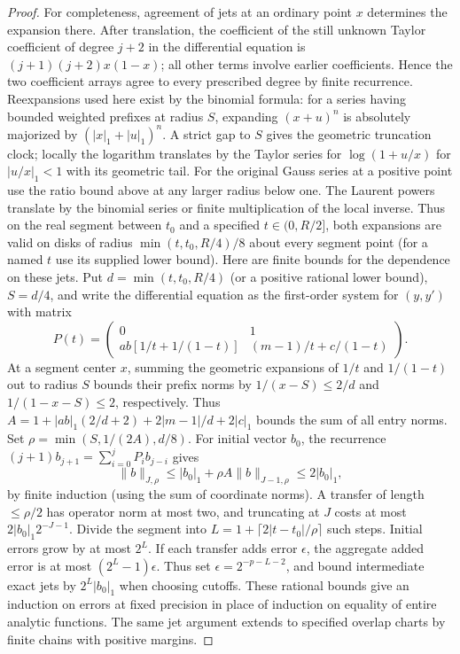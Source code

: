 \begin{proof}
For completeness, agreement of jets at an ordinary point $x$ determines
the expansion there. After translation, the coefficient of the still
unknown Taylor coefficient of degree $j+2$ in the differential equation
is $(j+1)(j+2)x(1-x)$; all other terms involve earlier coefficients.
Hence the two coefficient arrays agree to every prescribed degree by
finite recurrence. Reexpansions used here exist by the binomial formula:
for a series having bounded weighted prefixes at radius $S$, expanding
$(x+u)^n$ is absolutely majorized by $(|x|_1+|u|_1)^n$. A strict gap
to $S$ gives the geometric truncation clock; locally the logarithm
translates by the Taylor series for $\log(1+u/x)$ for $|u/x|_1<1$
with its geometric tail. For the original Gauss series at a positive
point use the ratio bound above at any larger radius below one.
The Laurent powers translate by the binomial series or finite
multiplication of the local inverse. Thus on the real segment between
$t_0$ and a specified $t\in(0,R/2]$, both expansions are valid on disks
of radius $\min(t,t_0,R/4)/8$ about every segment point (for a named
$t$ use its supplied lower bound). Here are finite
bounds for the dependence on these jets. Put $d=\min(t,t_0,R/4)$
(or a positive rational lower bound), $S=d/4$, and write the differential
equation as the first-order system for $(y,y')$ with matrix
\[
 P(t)=
 \begin{pmatrix}
 0&1\\
 ab[1/t+1/(1-t)]&(m-1)/t+c/(1-t)
 \end{pmatrix}.
\]
At a segment center $x$, summing the geometric expansions of $1/t$ and
$1/(1-t)$ out to radius $S$ bounds their prefix norms by
$1/(x-S)\le 2/d$ and $1/(1-x-S)\le2$, respectively. Thus
$A=1+|ab|_1(2/d+2)+2|m-1|/d+2|c|_1$ bounds the sum of all entry norms.
Set $\rho=\min(S,1/(2A),d/8)$. For initial vector $b_0$, the recurrence
$(j+1)b_{j+1}=\sum_{i=0}^j P_i b_{j-i}$ gives
\[
 \|b\|_{J,\rho}\le |b_0|_1+\rho A\|b\|_{J-1,\rho}\le 2|b_0|_1 ,
\]
by finite induction (using the sum of coordinate norms). A transfer of
length $\le\rho/2$ has operator norm at most two, and truncating at $J$
costs at most $2|b_0|_1 2^{-J-1}$. Divide the segment into
$L=1+\lceil2|t-t_0|/\rho\rceil$ such steps. Initial errors grow by
at most $2^L$. If each transfer adds error $\epsilon$, the aggregate
added error is at most $(2^L-1)\epsilon$. Thus set
$\epsilon=2^{-p-L-2}$, and bound intermediate exact jets by
$2^L|b_0|_1$ when choosing cutoffs. These rational bounds give an
induction on errors at fixed precision in place of induction on equality
of entire analytic functions. The same jet argument extends
to specified overlap charts by finite chains with positive margins.
\end{proof}


